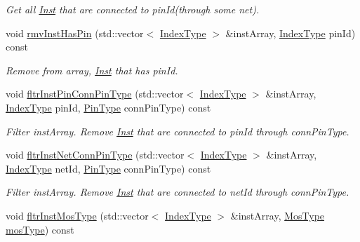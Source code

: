 \begin{DoxyCompactItemize}
\begin{DoxyCompactList}\small\item\em Get all \hyperlink{classInst}{Inst} that are connected to pin\+Id(through some net). \end{DoxyCompactList}\item 
void \hyperlink{classNetlist_abba19cc3b269dda137f801a555899ca6}{rmv\+Inst\+Has\+Pin} (std\+::vector$<$ \hyperlink{type_8h_a581e8093e28e7362f2b6937296190676}{Index\+Type} $>$ \&inst\+Array, \hyperlink{type_8h_a581e8093e28e7362f2b6937296190676}{Index\+Type} pin\+Id) const
\begin{DoxyCompactList}\small\item\em Remove from array, \hyperlink{classInst}{Inst} that has pin\+Id. \end{DoxyCompactList}\item 
void \hyperlink{classNetlist_a1df5b1bb963671f65331c287d4d56b2d}{fltr\+Inst\+Pin\+Conn\+Pin\+Type} (std\+::vector$<$ \hyperlink{type_8h_a581e8093e28e7362f2b6937296190676}{Index\+Type} $>$ \&inst\+Array, \hyperlink{type_8h_a581e8093e28e7362f2b6937296190676}{Index\+Type} pin\+Id, \hyperlink{type_8h_afaab50027002ecbb6c8ac27e727d1bb4}{Pin\+Type} conn\+Pin\+Type) const
\begin{DoxyCompactList}\small\item\em Filter inst\+Array. Remove \hyperlink{classInst}{Inst} that are connected to pin\+Id through conn\+Pin\+Type. \end{DoxyCompactList}\item 
void \hyperlink{classNetlist_a525b81a4d2bba3c381c9d76be91acba8}{fltr\+Inst\+Net\+Conn\+Pin\+Type} (std\+::vector$<$ \hyperlink{type_8h_a581e8093e28e7362f2b6937296190676}{Index\+Type} $>$ \&inst\+Array, \hyperlink{type_8h_a581e8093e28e7362f2b6937296190676}{Index\+Type} net\+Id, \hyperlink{type_8h_afaab50027002ecbb6c8ac27e727d1bb4}{Pin\+Type} conn\+Pin\+Type) const
\begin{DoxyCompactList}\small\item\em Filter inst\+Array. Remove \hyperlink{classInst}{Inst} that are connected to net\+Id through conn\+Pin\+Type. \end{DoxyCompactList}\item 
void \hyperlink{classNetlist_a5efc5375bb3c58e71e068278eadb4764}{fltr\+Inst\+Mos\+Type} (std\+::vector$<$ \hyperlink{type_8h_a581e8093e28e7362f2b6937296190676}{Index\+Type} $>$ \&inst\+Array, \hyperlink{type_8h_a34a6a66323cfecf83dfe00bc8fd96333}{Mos\+Type} \hyperlink{classNetlist_a3dba84b8588a528e42b066083744958f}{mos\+Type}) const

\end{DoxyCompactItemize}
